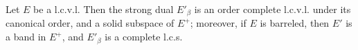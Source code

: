 Let $E$ be a l.c.v.l. Then the strong dual $E'_\beta$ is an order complete l.c.v.l. under its canonical order, and a solid subspace of $E^+$; moreover, if $E$ is barreled, then $E'$ is a band in $E^+$, and $E'_\beta$ is a complete l.c.s.

